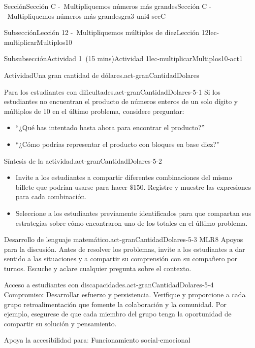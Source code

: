 \documentclass[oneside,10pt,]{article}
\begin{document}
\begin{sectionptx}{Sección}{Sección C -~Multipliquemos números más grandes}{}{Sección C -~Multipliquemos números más grandes}{}{}{gra3-uni4-secC}
\begin{subsectionptx}{Subsección}{Lección 12 -~Multipliquemos múltiplos de diez}{}{Lección 12}{}{}{lec-multiplicarMultiplos10}
\begin{subsubsectionptx}{Subsubsección}{Actividad 1~(15 mins)}{}{Actividad 1}{}{}{lec-multiplicarMultiplos10-act1}
\begin{activity}{Actividad}{Una gran cantidad de dólares.}{act-granCantidadDolares}
\begin{enumerate}
\end{enumerate}
\end{activity}%
%
\par
\begin{paragraphs}{Para los estudiantes con dificultades.}{act-granCantidadDolares-5-1}%
Si los estudiantes no encuentran el producto de números enteros de un solo dígito y múltiplos de 10 en el último problema, considere preguntar:%
%
\begin{itemize}[label=\textbullet]
\item{}``¿Qué has intentado hasta ahora para encontrar el producto?''%
\item{}``¿Cómo podrías representar el producto con bloques en base diez?''%
\end{itemize}
\end{paragraphs}%
\begin{paragraphs}{Síntesis de la actividad.}{act-granCantidadDolares-5-2}%
%
\begin{itemize}[label=\textbullet]
\item{}Invite a los estudiantes a compartir diferentes combinaciones del mismo billete que podrían usarse para hacer \(\$150\). Registre y muestre las expresiones para cada combinación.%
\item{}Seleccione a los estudiantes previamente identificados para que compartan sus estrategias sobre cómo encontraron uno de los totales en el último problema.%
\end{itemize}
\end{paragraphs}%
\begin{paragraphs}{Desarrollo de lenguaje matemático.}{act-granCantidadDolares-5-3}%
MLR8 Apoyos para la discusión. Antes de resolver los problemas, invite a los estudiantes a dar sentido a las situaciones y a compartir su comprensión con su compañero por turnos. Escuche y aclare cualquier pregunta sobre el contexto.%
\end{paragraphs}%
\begin{paragraphs}{Acceso a estudiantes con discapacidades.}{act-granCantidadDolares-5-4}%
Compromiso: Desarrollar esfuerzo y persistencia. Verifique y proporcione a cada grupo retroalimentación que fomente la colaboración y la comunidad. Por ejemplo, esegurese de que cada miembro del grupo tenga la oportunidad de compartir su solución y pensamiento.%
\par
Apoya la accesibilidad para: Funcionamiento social-emocional%

\end{paragraphs}
\end{subsubsectionptx}
\end{subsectionptx}
\end{sectionptx}
\end{document}
